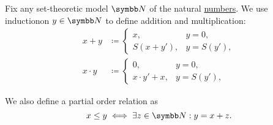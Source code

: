 \begin{definition}\label{def:natural_number_operations}
  Fix any set-theoretic model \( \BN \) of the natural \hyperref[def:natural_numbers]{numbers}. We use induction\IND on \( y \in \BN \) to define addition and multiplication:
  \begin{align*}
    x + y &\coloneqq \begin{cases}
      x, &y = 0, \\
      S(x + y'), &y = S(y'),
    \end{cases}
    \\
    x \cdot y &\coloneqq \begin{cases}
      0, &y = 0, \\
      x \cdot y' + x, &y = S(y'),
    \end{cases}
  \end{align*}

  We also define a partial order relation as
  \begin{equation*}
    x \leq y \iff \exists z \in \BN: y = x + z.
  \end{equation*}
\end{definition}


